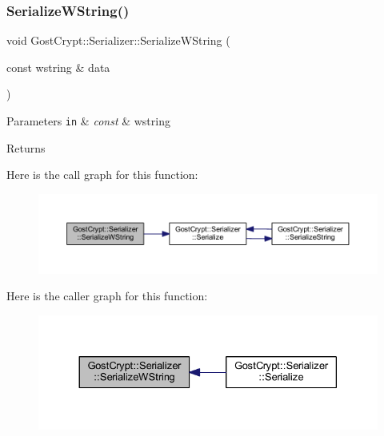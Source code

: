 \subsubsection{\texorpdfstring{Serialize\+W\+String()}{SerializeWString()}}
{\footnotesize\ttfamily void Gost\+Crypt\+::\+Serializer\+::\+Serialize\+W\+String (\begin{DoxyParamCaption}\item[{const wstring \&}]{data }\end{DoxyParamCaption})\hspace{0.3cm}{\ttfamily [protected]}}


\begin{DoxyParams}[1]{Parameters}
\mbox{\tt in}  & {\em const} & wstring \\
\hline
\end{DoxyParams}
\begin{DoxyReturn}{Returns}

\end{DoxyReturn}
Here is the call graph for this function\+:
\nopagebreak
\begin{figure}[H]
\begin{center}
\leavevmode
\includegraphics[width=350pt]{class_gost_crypt_1_1_serializer_aea0bc16b69e4df001a1477d9808bdc07_cgraph}
\end{center}
\end{figure}
Here is the caller graph for this function\+:
\nopagebreak
\begin{figure}[H]
\begin{center}
\leavevmode
\includegraphics[width=330pt]{class_gost_crypt_1_1_serializer_aea0bc16b69e4df001a1477d9808bdc07_icgraph}
\end{center}
\end{figure}
\mbox{\label{class_gost_crypt_1_1_serializer_ae0fef965dbfaeade8efd26bf7062a889}} 
